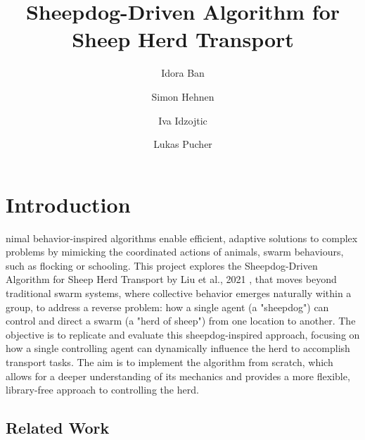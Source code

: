 \documentclass[9pt]{pnas-new}
\title{Sheepdog-Driven Algorithm for Sheep Herd Transport}
\author{Idora Ban}
\author{Simon Hehnen}
\author{Iva Idzojtic}
\author{Lukas Pucher}
\affil{Collective behaviour course research seminar report}
\begin{document}
\verticaladjustment{-2pt}

\maketitle
\thispagestyle{firststyle}


\section*{Introduction}

nimal behavior-inspired algorithms enable efficient, adaptive solutions to complex problems by mimicking the coordinated actions of animals, swarm behaviours, such as flocking or schooling. This project explores the Sheepdog-Driven Algorithm for Sheep Herd Transport by Liu et al., 2021 \cite{liu2021}, that moves beyond traditional swarm systems, where collective behavior emerges naturally within a group, to address a reverse problem: how a single agent (a "sheepdog") can control and direct a swarm (a "herd of sheep") from one location to another.
 The objective is to replicate and evaluate this sheepdog-inspired approach, focusing on how a single controlling agent can dynamically influence the herd to accomplish transport tasks. The aim is to implement the algorithm from scratch, which allows for a deeper understanding of its mechanics and provides a more flexible, library-free approach to controlling the herd.






\subsection*{Related Work}
\end{document}
